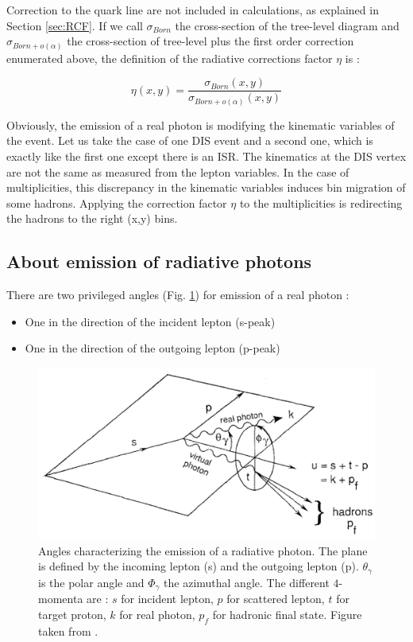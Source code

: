 Correction to the quark line are not included in calculations, as explained in Section \ref{sec:RCF}. If we call $\sigma_{Born}$ the cross-section of the tree-level diagram and $\sigma_{Born+o(\alpha)}$ the cross-section of tree-level plus the first order correction enumerated above, the definition of the radiative corrections factor $\eta$ is :

\begin{equation} \label{eq:RCF_def}
  \eta(x,y)=\frac{\sigma_{Born}(x,y)}{\sigma_{Born+o(\alpha)}(x,y)}
\end{equation}

Obviously, the emission of a real photon is modifying the kinematic variables of the event. Let us take the case of one DIS event and a second one, which is exactly like the first one except there is an ISR. The kinematics at the DIS vertex are not the same as measured from the lepton variables. In the case of multiplicities, this discrepancy in the kinematic variables induces bin migration of some hadrons. Applying the correction factor $\eta$ to the multiplicities is redirecting the hadrons to the right (x,y) bins.

\subsection{About emission of radiative photons}

There are two privileged angles (Fig. \ref{fig:plan}) for emission of a real photon :
\begin{itemize}
\item One in the direction of the incident lepton (s-peak)
\item One in the direction of the outgoing lepton (p-peak)
\end{itemize}

\begin{figure}[h!]
\centering
\includegraphics[width=12cm]{gfx/plan_angle.png}
\caption{Angles characterizing the emission of a radiative photon. The plane is defined by the incoming lepton (s) and the outgoing lepton (p). $\theta_\gamma$ is the polar angle and $\Phi_\gamma$ the azimuthal angle. The different $4$-momenta are : $s$ for incident lepton, $p$ for scattered lepton, $t$ for target proton, $k$ for real photon, $p_f$ for hadronic final state. Figure taken from \cite{TERAD2}.}
\label{fig:plan}
\end{figure}

